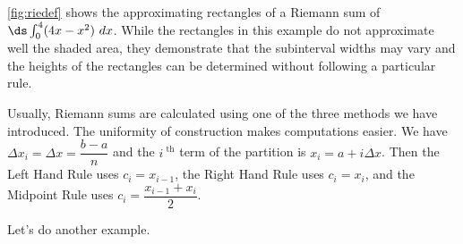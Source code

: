 \autoref{fig:riedef} shows the approximating rectangles of a Riemann sum of $\ds\int_0^4(4x-x^2)\ dx$. While the rectangles in this example do not approximate well the shaded area, they demonstrate that the subinterval widths may vary and the heights of the rectangles can be determined without following a particular rule.

Usually, Riemann sums are calculated using one of the three methods we have introduced. The uniformity of construction makes computations easier. We have $\Delta x_i = \Delta x = \dfrac{b-a}n$ and the $i^\text{ th}$ term of the partition is $x_i = a + i\Delta x$.  Then the Left Hand Rule uses $c_i=x_{i-1}$, the Right Hand Rule uses $c_i=x_i$, and the Midpoint Rule uses $c_i=\dfrac{x_{i-1}+x_i}{2}$.


%

Let's do another example.

